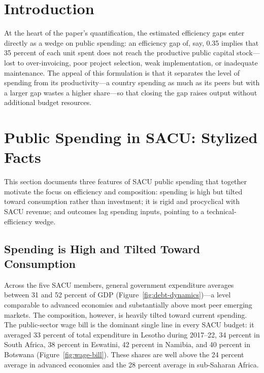 \documentclass[11pt]{article}
\begin{document}
\setcounter{section}{0}
\section{Introduction}
\label{sec:intro}

At the heart of the paper's quantification, the estimated efficiency gaps enter
directly as a wedge on public spending: an efficiency gap of, say, 0.35 implies
that 35 percent of each unit spent does not reach the productive public capital
stock---lost to over-invoicing, poor project selection, weak implementation, or
inadequate maintenance. The appeal of this formulation is that it separates the
level of spending from its productivity---a country spending as much as its
peers but with a larger gap wastes a higher share---so that closing the gap
raises output without additional budget resources.

\section{Public Spending in SACU: Stylized Facts}
\label{sec:stylized-facts}

This section documents three features of SACU public spending that together motivate the focus on efficiency and composition: spending is high but tilted toward consumption rather than investment; it is rigid and procyclical with SACU revenue; and outcomes lag spending inputs, pointing to a technical-efficiency wedge.

\subsection{Spending is High and Tilted Toward Consumption}
\label{sec:spending-high}

Across the five SACU members, general government expenditure averages between 31 and 52 percent of GDP (Figure~\ref{fig:debt-dynamics})---a level comparable to advanced economies and substantially above most peer emerging markets. The composition, however, is heavily tilted toward current spending. The public-sector wage bill is the dominant single line in every SACU budget: it averaged 33 percent of total expenditure in Lesotho during 2017--22, 34 percent in South Africa, 38 percent in Eswatini, 42 percent in Namibia, and 40 percent in Botswana (Figure~\ref{fig:wage-bill}). These shares are well above the 24 percent average in advanced economies and the 28 percent average in sub-Saharan Africa.
\end{document}
